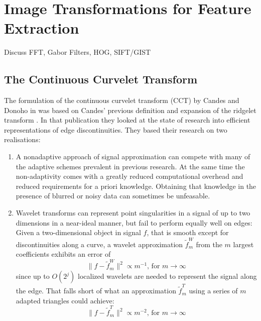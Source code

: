 \section{Image Transformations for Feature Extraction}

Discuss FFT, Gabor Filters, HOG, SIFT/GIST

\subsection{The Continuous Curvelet Transform}

The formulation of the continuous curvelet transform (CCT) by Candes and Donoho
in \autocite{candes_curvelets:_2000} was based on Candes' previous definition and
expansion of the ridgelet transform \autocite{candes_ridgelets:_1998}. In that
publication they looked at the state of research into efficient representations
of edge discontinuities. They based their research on two realisations:
\begin{enumerate}
    \item A nonadaptive approach of signal approximation can compete with many
        of the adaptive schemes prevalent in previous research. At the same
        time the non-adaptivity comes with a greatly reduced computational
        overhead and reduced requirements for a priori knowledge. Obtaining
        that knowledge in the presence of blurred or noisy data can sometimes
        be unfeasable.
    \item Wavelet transforms can represent point singularities in a signal of
        up to two dimensions in a near-ideal manner, but fail to perform
        equally well on edges: Given a two-dimensional object in signal $f$, that
        is smooth except for discontinuities along a curve, a wavelet
        approximation $\tilde{f}^W_m$ from the $m$ largest coefficients
        exhibits an error of
        \begin{equation*}
            \| f - \tilde{f}^W_m \|^2 \propto m^{-1} \text{, for } m \rightarrow \infty
        \end{equation*}
        since up to $O(2^j)$ localized wavelets are needed to represent the
        signal along the edge. That falls short of what an approximation
        $\tilde{f}^T_m$ using a series of $m$ adapted triangles could achieve:
        \begin{equation*}
            \| f - \tilde{f}^T_m \|^2 \propto m^{-2} \text{, for } m \rightarrow \infty
        \end{equation*}
\end{enumerate}
